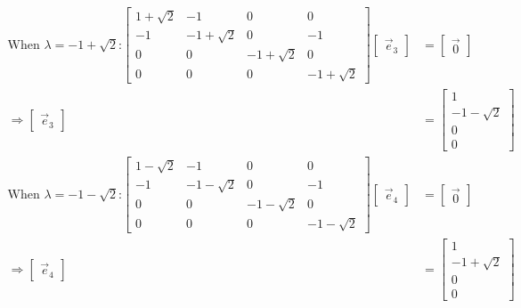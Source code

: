 \documentclass[11pt]{homework}
\begin{document}
\begin{align*}
\text{When $\lambda = -1 + \sqrt{2}$:}
  \begin{bmatrix}
  1+\sqrt{2} & -1 & 0 & 0  \\
  -1 & -1+\sqrt{2} & 0 & -1  \\
  0 & 0 & -1+\sqrt{2} & 0  \\
  0 & 0 & 0 &-1+\sqrt{2}
  \end{bmatrix} 
  \begin{bmatrix}
  \vec e_3
  \end{bmatrix}
  &=
  \begin{bmatrix}
  \vec 0
  \end{bmatrix} \\
\Rightarrow
  \begin{bmatrix}
  \vec e_3
  \end{bmatrix}
  &=
  \begin{bmatrix}
  1 \\
  -1 - \sqrt{2} \\
  0 \\
  0
  \end{bmatrix}  \\
\text{When $\lambda = -1 - \sqrt{2}$:}
  \begin{bmatrix}
  1-\sqrt{2} & -1 & 0 & 0  \\
  -1 & -1-\sqrt{2} & 0 & -1  \\
  0 & 0 & -1-\sqrt{2} & 0  \\
  0 & 0 & 0 &-1-\sqrt{2}
  \end{bmatrix} 
  \begin{bmatrix}
  \vec e_4
  \end{bmatrix}
  &=
  \begin{bmatrix}
  \vec 0
  \end{bmatrix} \\
\Rightarrow
  \begin{bmatrix}
  \vec e_4
  \end{bmatrix}
  &=
  \begin{bmatrix}
  1 \\
  -1 + \sqrt{2} \\
  0 \\
  0
  \end{bmatrix} 
\end{align*}
\end{document}
